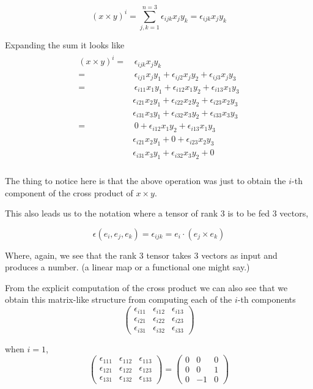 $$
\left( x \times y \right)^i = \sum_{j,k=1}^{n=3} \epsilon_{ijk} x_j y_k = \epsilon_{ijk} x_j y_k
$$

Expanding the sum it looks like
\begin{align}
    \begin{split}
\left( x \times y \right)^i =& \, \epsilon_{ijk} x_j y_k \\
=& \, \epsilon_{ij1} x_j y_1 + \epsilon_{ij2} x_j y_2 + \epsilon_{ij3} x_j y_3 \\
=& \, \epsilon_{i11} x_1 y_1 + \epsilon_{i12} x_1 y_2 + \epsilon_{i13} x_1 y_3 \\
    & \epsilon_{i21} x_2 y_1 + \epsilon_{i22} x_2 y_2 + \epsilon_{i23} x_2 y_3 \\
    & \epsilon_{i31} x_3 y_1 + \epsilon_{i32} x_3 y_2 + \epsilon_{i33} x_3 y_3 \\
=& \, 0 + \epsilon_{i12} x_1 y_2 + \epsilon_{i13} x_1 y_3 \\
    & \epsilon_{i21} x_2 y_1 + 0 + \epsilon_{i23} x_2 y_3 \\
    & \epsilon_{i31} x_3 y_1 + \epsilon_{i32} x_3 y_2 + 0 \\
    \end{split}
\end{align} \label{tensors:levi-civita-component-i}

The thing to notice here is that the above operation was just to obtain the $i$-th component of the cross product
of $x \times y$.

This also leads us to the notation where a tensor of rank 3 is to be fed 3 vectors,

$$
\epsilon (e_i, e_j, e_k) = \epsilon_{ijk} = e_i \cdot (e_j \times e_k)
$$

Where, again, we see that the rank 3 tensor takes 3 vectors as input and produces a number.
(a linear map or a functional one might say.)

From the explicit computation of the cross product we can also see that we obtain this matrix-like
structure from computing each of the $i$-th components
$$
\begin{pmatrix}
\epsilon_{i11} & \epsilon_{i12} & \epsilon_{i13} \\
\epsilon_{i21} & \epsilon_{i22} & \epsilon_{i23} \\
\epsilon_{i31} & \epsilon_{i32} & \epsilon_{i33}
\end{pmatrix}
$$

when $i=1$,
$$
\begin{pmatrix}
\epsilon_{111} & \epsilon_{112} & \epsilon_{113} \\
\epsilon_{121} & \epsilon_{122} & \epsilon_{123} \\
\epsilon_{131} & \epsilon_{132} & \epsilon_{133}
\end{pmatrix}
=
\begin{pmatrix}
0 & 0 & 0 \\
0 & 0 & 1 \\
0 & -1 & 0
\end{pmatrix}
$$

